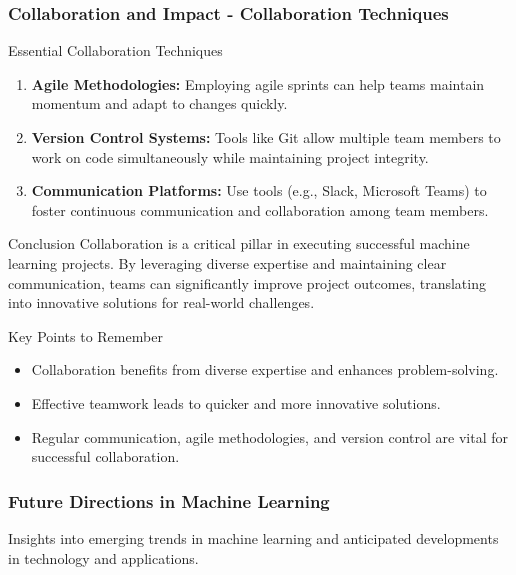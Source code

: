 \documentclass[aspectratio=169]{beamer}
\begin{document}
\begin{frame}[fragile]
    \frametitle{Collaboration and Impact - Collaboration Techniques}
    \begin{block}{Essential Collaboration Techniques}
        \begin{enumerate}
            \item \textbf{Agile Methodologies:}
                Employing agile sprints can help teams maintain momentum and adapt to changes quickly.
            \item \textbf{Version Control Systems:}
                Tools like Git allow multiple team members to work on code simultaneously while maintaining project integrity.
            \item \textbf{Communication Platforms:}
                Use tools (e.g., Slack, Microsoft Teams) to foster continuous communication and collaboration among team members.
        \end{enumerate}
    \end{block}

    \begin{block}{Conclusion}
        Collaboration is a critical pillar in executing successful machine learning projects. By leveraging diverse expertise and maintaining clear communication, teams can significantly improve project outcomes, translating into innovative solutions for real-world challenges.
    \end{block}
    
    \begin{block}{Key Points to Remember}
        \begin{itemize}
            \item Collaboration benefits from diverse expertise and enhances problem-solving.
            \item Effective teamwork leads to quicker and more innovative solutions.
            \item Regular communication, agile methodologies, and version control are vital for successful collaboration.
        \end{itemize}
    \end{block}
\end{frame}

\begin{frame}[fragile]
    \frametitle{Future Directions in Machine Learning}
    Insights into emerging trends in machine learning and anticipated developments in technology and applications.
\end{frame}
\end{document}
